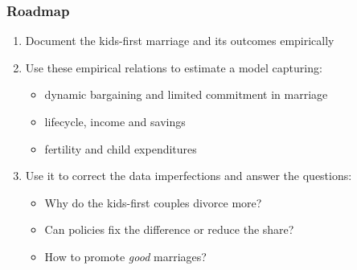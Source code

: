 \documentclass[aspectratio=169]{beamer}
\let\olditem\item
\renewcommand{\item}{%
\olditem\vspace{\fill}}
\begin{document}
%
%


\begin{frame}
\frametitle{Roadmap}
\begin{enumerate}
\item Document the kids-first marriage and its outcomes empirically
\item Use these empirical relations to estimate a model capturing:
\begin{itemize}
\item dynamic bargaining and limited commitment in marriage
\item lifecycle, income and savings
\item fertility and child expenditures
\end{itemize}
\item Use it to correct the data imperfections and answer the questions:
\begin{itemize}
\item Why do the kids-first couples divorce more?
\item Can policies fix the difference or reduce the share?
\item How to promote \emph{good} marriages?
\end{itemize}
\end{enumerate}
\end{frame}
\end{document}
